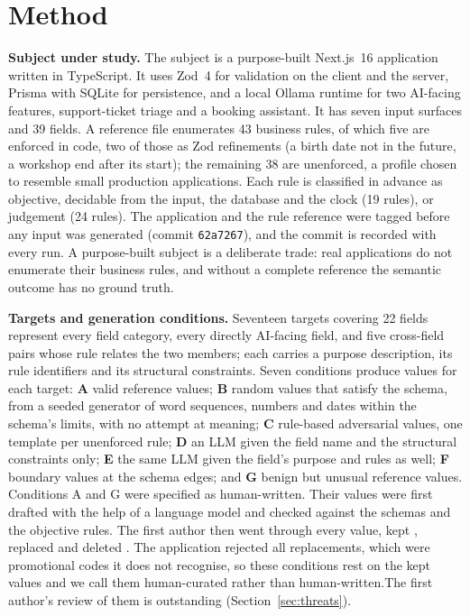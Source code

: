 \documentclass[journal]{IEEEtran}
\begin{document}
\section{Method}
\label{sec:method}

\textbf{Subject under study.} The subject is a purpose-built Next.js~16 application written in TypeScript. It uses Zod~4 for
validation on the client and the server, Prisma with SQLite for persistence, and a local Ollama runtime
for two AI-facing features, support-ticket triage and a booking assistant. It has seven input surfaces and 39 fields. A reference file enumerates 43 business rules, of which
five are enforced in code, two of those as Zod refinements (a birth date not in the future, a workshop
end after its start); the remaining 38 are unenforced, a profile chosen to resemble small production
applications. Each rule is classified in advance as objective, decidable from the input, the database
and the clock (19 rules), or judgement (24 rules). The application and the rule reference were tagged
before any input was generated (commit \texttt{62a7267}), and the commit is recorded with every run. A
purpose-built subject is a deliberate trade: real applications do not enumerate their business rules,
and without a complete reference the semantic outcome has no ground truth.

\textbf{Targets and generation conditions.} Seventeen targets covering 22 fields represent every field category, every directly AI-facing field,
and five cross-field pairs whose rule relates the two members; each carries a purpose description, its
rule identifiers and its structural constraints. Seven conditions produce values for each target: \textbf{A} valid reference values; \textbf{B} random values that satisfy the
schema, from a seeded generator of word sequences, numbers and dates within the schema's limits, with no
attempt at meaning; \textbf{C} rule-based adversarial values, one template per unenforced rule;
\textbf{D} an LLM given the field name and the structural constraints only; \textbf{E} the same LLM
given the field's purpose and rules as well; \textbf{F} boundary values at the schema edges; and
\textbf{G} benign but unusual reference values. Conditions A and G were specified as human-written. Their  values were first
drafted with the help of a language model and checked against the schemas and the objective rules.
\ifreviewed The first author then went through every value, kept , replaced 
and deleted . The application rejected all  replacements, which were
promotional codes it does not recognise, so these conditions rest on the kept values and we call them
human-curated rather than human-written.\else The first author's review of them is outstanding
(Section~\ref{sec:threats}).\fi
\end{document}
